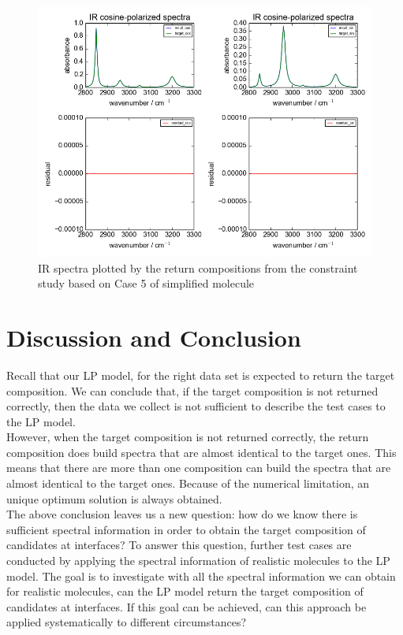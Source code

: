 \begin{figure}[!ht] 
\centering
\includegraphics[scale=0.7]{Figures/toy_model_result_plotting_ir_sin_10candi_constraint_study_experiment5.png} 
\caption{IR spectra plotted by the return compositions from the constraint study based on Case 5 of simplified molecule}\label{fig:3.6}
\end{figure}

\section{Discussion and Conclusion}

Recall that our LP model, for the right data set is expected to return the target composition. We can conclude that, if the target composition is not returned correctly, then the data we collect is not sufficient to describe the test cases to the LP model. \\

However, when the target composition is not returned correctly, the return composition does build spectra that are almost identical to the target ones. This means that there are more than one composition can build the spectra that are almost identical to the target ones. Because of the numerical limitation, an unique optimum solution is always obtained. \\

The above conclusion leaves us a new question: how do we know there is sufficient spectral information in order to obtain the target composition of candidates at interfaces? To answer this question, further test cases are conducted by applying the spectral information of realistic molecules to the LP model. The goal is to investigate with all the spectral information we can obtain for realistic molecules, can the LP model return the target composition of candidates at interfaces. If this goal can be achieved, can this approach be applied systematically to different circumstances?


